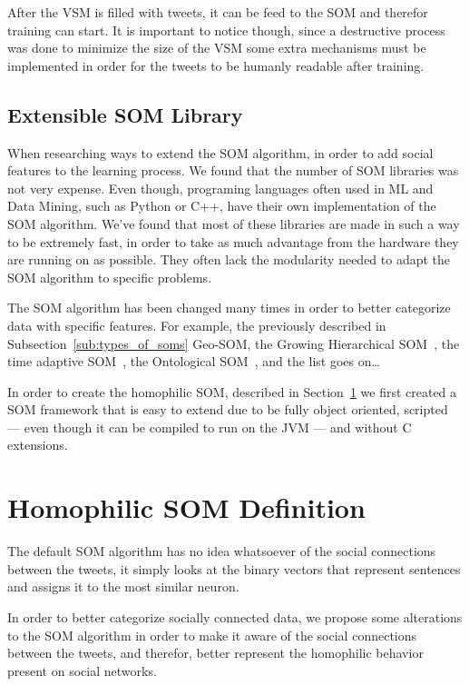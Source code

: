 After the \ac{VSM} is filled with tweets, it can be feed to the \ac{SOM} and therefor training can start. It is important to notice though, since a destructive process was done to minimize the size of the \ac{VSM} some extra mechanisms must be implemented in order for the tweets to be humanly readable after training.



\subsection{Extensible SOM Library}
\label{sub:extensible_som_library}

When researching ways to extend the \ac{SOM} algorithm, in order to add social features to the learning process. We found that the number of \ac{SOM} libraries was not very expense. Even though, programing languages often used in \ac{ML} and Data Mining, such as Python or C++, have their own implementation of the \ac{SOM} algorithm. We've found that most of these libraries are made in such a way to be extremely fast, in order to take as much advantage from the hardware they are running on as possible. They often lack the modularity needed to adapt the \ac{SOM} algorithm to specific problems.

The \ac{SOM} algorithm has been changed many times in order to better categorize data with specific features. For example, the previously described in Subsection~\ref{sub:types_of_soms} Geo-\ac{SOM}, the Growing Hierarchical \ac{SOM}~\cite[]{1058070}, the time adaptive \ac{SOM}~\cite[]{1187438}, the Ontological \ac{SOM}~\cite[]{5446427}, and the list goes on\dots  

In order to create the homophilic \ac{SOM}, described in Section~\ref{sec:algorithm_changes} we first created a \ac{SOM} framework that is easy to extend due to be fully object oriented, scripted --- even though it can be compiled to run on the JVM --- and without C extensions.



\section{Homophilic SOM Definition}
\label{sec:algorithm_changes}
The default \ac{SOM} algorithm has no idea whatsoever of the social connections between the tweets, it simply looks at the binary vectors that represent sentences and assigns it to the most similar neuron.

In order to better categorize socially connected data, we propose some alterations to the \ac{SOM} algorithm in order to make it aware of the social connections between the tweets, and therefor, better represent the homophilic behavior present on social networks.

